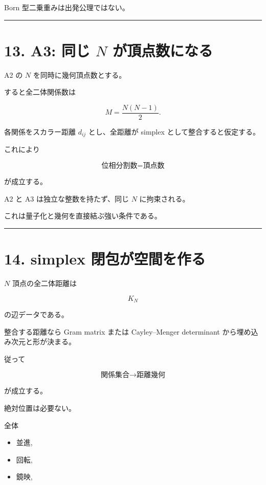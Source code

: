 \documentclass[
  a4paper,
]{ltjsarticle}
\providecommand{\tightlist}{%
  \setlength{\itemsep}{0pt}\setlength{\parskip}{0pt}}
\begin{document}
Born 型二乗重みは出発公理ではない。

\begin{center}\rule{0.5\linewidth}{0.5pt}\end{center}

\section{\texorpdfstring{13. A3: 同じ \(N\)
が頂点数になる}{13. A3: 同じ N が頂点数になる}}\label{a3-ux540cux3058-n-ux304cux9802ux70b9ux6570ux306bux306aux308b}

A2 の \(N\) を同時に幾何頂点数とする。

すると全二体関係数は

\[
\boxed{
M=\frac{N(N-1)}2
}.
\]

各関係をスカラー距離 \(d_{ij}\) とし、全距離が simplex
として整合すると仮定する。

これにより

\[
\boxed{
\text{位相分割数}
=
\text{頂点数}
}
\]

が成立する。

A2 と A3 は独立な整数を持たず、同じ \(N\) に拘束される。

これは量子化と幾何を直接結ぶ強い条件である。

\begin{center}\rule{0.5\linewidth}{0.5pt}\end{center}

\section{14. simplex
閉包が空間を作る}\label{simplex-ux9589ux5305ux304cux7a7aux9593ux3092ux4f5cux308b}

\(N\) 頂点の全二体距離は

\[
K_N
\]

の辺データである。

整合する距離なら Gram matrix または Cayley--Menger determinant
から埋め込み次元と形が決まる。

従って

\[
\boxed{
\text{関係集合}
\to
\text{距離幾何}
}
\]

が成立する。

絶対位置は必要ない。

全体

\begin{itemize}
\tightlist
\item
  並進,
\item
  回転,
\item
  鏡映,
\end{itemize}
\end{document}
